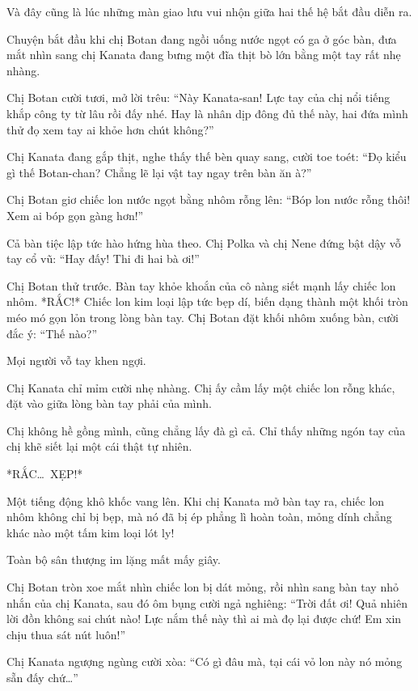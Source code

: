 \documentclass[../main.tex]{subfiles}
\begin{document}
Và đây cũng là lúc những màn giao lưu vui nhộn giữa hai thế hệ bắt đầu diễn ra.


Chuyện bắt đầu khi chị Botan đang ngồi uống nước ngọt có ga ở góc bàn, đưa mắt nhìn sang chị Kanata đang bưng một đĩa thịt bò lớn bằng một tay rất nhẹ nhàng.

Chị Botan cười tươi, mở lời trêu: ``Này Kanata-san! Lực tay của chị nổi tiếng khắp công ty từ lâu rồi đấy nhé. Hay là nhân dịp đông đủ thế này, hai đứa mình thử đọ xem tay ai khỏe hơn chút không?''

Chị Kanata đang gắp thịt, nghe thấy thế bèn quay sang, cười toe toét: ``Đọ kiểu gì thế Botan-chan? Chẳng lẽ lại vật tay ngay trên bàn ăn à?''

Chị Botan giơ chiếc lon nước ngọt bằng nhôm rỗng lên: ``Bóp lon nước rỗng thôi! Xem ai bóp gọn gàng hơn!''

Cả bàn tiệc lập tức hào hứng hùa theo. Chị Polka và chị Nene đứng bật dậy vỗ tay cổ vũ: ``Hay đấy! Thi đi hai bà ơi!''

Chị Botan thử trước. Bàn tay khỏe khoắn của cô nàng siết mạnh lấy chiếc lon nhôm. *RẮC!* Chiếc lon kim loại lập tức bẹp dí, biến dạng thành một khối tròn méo mó gọn lỏn trong lòng bàn tay. Chị Botan đặt khối nhôm xuống bàn, cười đắc ý: ``Thế nào?''

Mọi người vỗ tay khen ngợi.

Chị Kanata chỉ mỉm cười nhẹ nhàng. Chị ấy cầm lấy một chiếc lon rỗng khác, đặt vào giữa lòng bàn tay phải của mình.

Chị không hề gồng mình, cũng chẳng lấy đà gì cả. Chỉ thấy những ngón tay của chị khẽ siết lại một cái thật tự nhiên.

*RẮC\dots\ XẸP!*

Một tiếng động khô khốc vang lên. Khi chị Kanata mở bàn tay ra, chiếc lon nhôm không chỉ bị bẹp, mà nó đã bị ép phẳng lì hoàn toàn, mỏng dính chẳng khác nào một tấm kim loại lót ly!

Toàn bộ sân thượng im lặng mất mấy giây.

Chị Botan tròn xoe mắt nhìn chiếc lon bị dát mỏng, rồi nhìn sang bàn tay nhỏ nhắn của chị Kanata, sau đó ôm bụng cười ngả nghiêng: ``Trời đất ơi! Quả nhiên lời đồn không sai chút nào! Lực nắm thế này thì ai mà đọ lại được chứ! Em xin chịu thua sát nút luôn!''

Chị Kanata ngượng ngùng cười xòa: ``Có gì đâu mà, tại cái vỏ lon này nó mỏng sẵn đấy chứ\dots''
\end{document}

